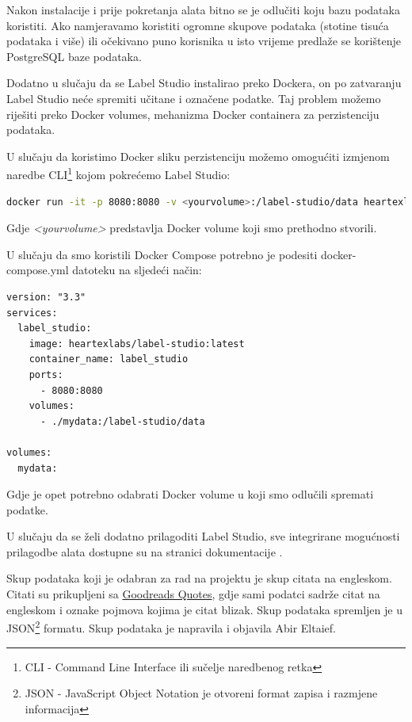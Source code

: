 \documentclass[times, utf8, zavrsni, numeric]{fer}
\begin{document}
Nakon instalacije i prije pokretanja alata bitno se je odlučiti koju bazu podataka koristiti. Ako namjeravamo koristiti ogromne skupove podataka (stotine tisuća podataka i više) ili očekivano puno korisnika u isto vrijeme predlaže se korištenje PostgreSQL baze podataka.

Dodatno u slučaju da se Label Studio instalirao preko Dockera, on po zatvaranju Label Studio neće spremiti učitane i označene podatke. Taj problem možemo riješiti preko Docker volumes, mehanizma Docker containera za perzistenciju podataka.

U slučaju da koristimo Docker sliku perzistenciju možemo omogućiti izmjenom naredbe CLI\footnote{CLI - Command Line Interface ili sučelje naredbenog retka} kojom pokrećemo Label Studio:
\begin{lstlisting}[language=bash]
docker run -it -p 8080:8080 -v <yourvolume>:/label-studio/data heartexlabs/label-studio:latest
\end{lstlisting}
Gdje \textit{<yourvolume>} predstavlja Docker volume koji smo prethodno stvorili.

U slučaju da smo koristili Docker Compose potrebno je podesiti docker-compose.yml datoteku na sljedeći način:

\begin{minipage}{\linewidth}
\begin{lstlisting}[language=docker-compose-2]
version: "3.3"
services:
  label_studio:
    image: heartexlabs/label-studio:latest
    container_name: label_studio
    ports:
      - 8080:8080
    volumes:
      - ./mydata:/label-studio/data

volumes:
  mydata:
\end{lstlisting}
\end{minipage}

Gdje je opet potrebno odabrati Docker volume u koji smo odlučili spremati podatke.

U slučaju da se želi dodatno prilagoditi Label Studio, sve integrirane mogućnosti prilagodbe alata dostupne su na stranici dokumentacije \citep{label_studio_docs}.

Skup podataka koji je odabran za rad na projektu je skup citata na engleskom. Citati su prikupljeni sa \href{https://www.goodreads.com/quotes}{Goodreads Quotes}, gdje sami podatci sadrže citat na engleskom i oznake pojmova kojima je citat blizak. Skup podataka spremljen je u JSON\footnote{JSON - JavaScript Object Notation je otvoreni format zapisa i razmjene informacija} formatu. Skup podataka je napravila i objavila Abir Eltaief. \citep{quotesdataset2021}
\end{document}
